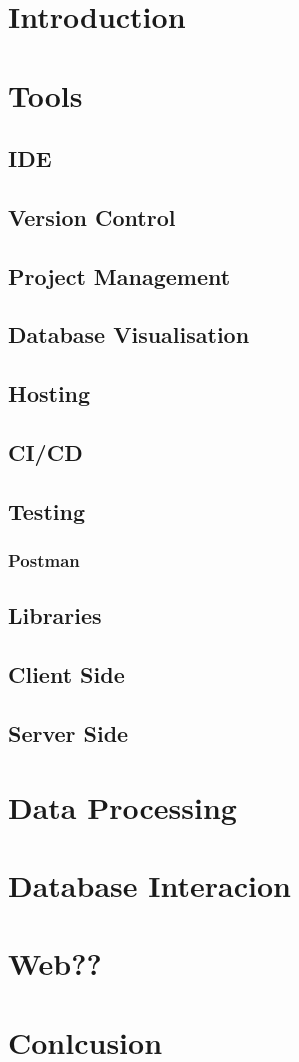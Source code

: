 \section{Introduction}
\section{Tools}
\subsection{IDE}
\subsection{Version Control}
\subsection{Project Management}
\subsection{Database Visualisation}
\subsection{Hosting}
\subsection{CI/CD}
\subsection{Testing}
\subsubsection{Postman}
\subsection{Libraries}
\subsection{Client Side}
\subsection{Server Side}
\section{Data Processing}
\section{Database Interacion}
\section{Web??}
\section{Conlcusion}